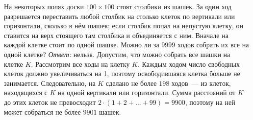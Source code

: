 \problem
На некоторых полях доски $100 \times 100$ стоят столбики из шашек.
За один ход разрешается переставить любой столбик на столько клеток по
вертикали или горизонтали, сколько в нём шашек;
если столбик попал на непустую клетку, он ставится на верх стоящего там
столбика и объединяется с ним.
Вначале на каждой клетке стоит по одной шашке.
Можно ли за $9999$ ходов собрать их все на одной клетке?
\solution
\emph{Ответ:} нельзя.
Допустим, что можно собрать все шашки на клетке $K$.
Рассмотрим все ходы на клетку $K$.
Каждым ходом число свободных клеток должно увеличиваться на 1, поэтому
освободившаяся клетка больше не занимается.
Следовательно, на $K$ сделано не более $198$ ходов~--- из клеток, находящихся
с $K$ на одной вертикали или горизонтали.
Сумма расстояний от $K$ до этих клеток не превосходит
$2 \cdot (1 + 2 + \ldots + 99) = 9900$,
поэтому на ней может собраться не более $9901$ шашек.
\endproblem
